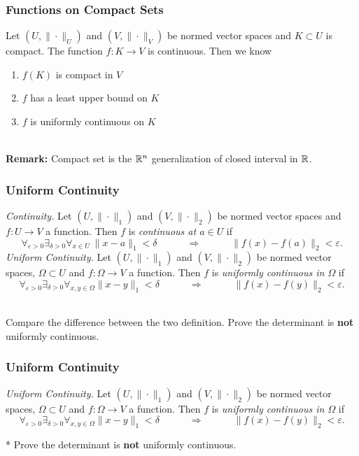 \documentclass[12pt, t]{beamer}
\renewcommand{\emph}[1]{{\color{Turquoise3}\textsl{#1}}}
\newcommand{\nullspace}{~\\[15pt]}
\begin{document}
\begin{frame}
    \frametitle{Functions on Compact Sets}
    Let $\left(U,\|\cdot\|_{U}\right)$ and $\left(V,\|\cdot\|_{V}\right)$ be normed vector spaces and $K \subset U$ is compact. The function $f: K \rightarrow V$ is continuous. Then we know
    \begin{enumerate}
        \item $f(K)$ is compact in $V$
        \item $f$ has a least upper bound on $K$
        \item $f$ is uniformly continuous on $K$
    \end{enumerate}
    \nullspace
    \textbf{Remark:} Compact set is the $\mathbb{R}^n$ generalization of closed interval in $\mathbb{R}$.
\end{frame}

\begin{frame}
    \frametitle{Uniform Continuity}
    \emph{Continuity.}
    Let $(U,\|\cdot\|_1)$ and $(V,\|\cdot\|_2)$ be normed vector spaces and $f:U\to V$ a function. Then $f$ is \emph{continuous at $a\in U$} if
    \begin{equation}\label{2.1.9}
        \mathop{\forall}_{\varepsilon>0}\mathop{\exists}_{\delta>0}\mathop{\forall}_{x\in U}~\|x-a\|_1<\delta\qquad\quad\Rightarrow\qquad\quad\|f(x)-f(a)\|_2<\varepsilon.
    \end{equation}
    \emph{Uniform Continuity.}
    Let $(U,\|\cdot\|_1)$ and $(V,\|\cdot\|_2)$ be normed vector spaces, $\Omega\subset U$ and $f:\Omega\to V$ a function. Then $f$ is \emph{uniformly continuous in $\Omega$} if
    \begin{equation}\label{2.1.13}
        \mathop{\forall}_{\varepsilon>0}\mathop{\exists}_{\delta>0}\mathop{\forall}_{x,y\in\Omega}\|x-y\|_1<\delta\qquad
        \quad\Rightarrow\qquad\quad\|f(x)-f(y)\|_2<\varepsilon.
    \end{equation}

    \nullspace
    Compare the difference between the two definition. \pause  * Prove the determinant is \textbf{not} uniformly continuous.
\end{frame}

\begin{frame}
    \frametitle{Uniform Continuity}
    \emph{Uniform Continuity.}
    Let $(U,\|\cdot\|_1)$ and $(V,\|\cdot\|_2)$ be normed vector spaces, $\Omega\subset U$ and $f:\Omega\to V$ a function. Then $f$ is \emph{uniformly continuous in $\Omega$} if
    \begin{equation}\label{2.1.13}
        \mathop{\forall}_{\varepsilon>0}\mathop{\exists}_{\delta>0}\mathop{\forall}_{x,y\in\Omega}\|x-y\|_1<\delta\qquad
        \quad\Rightarrow\qquad\quad\|f(x)-f(y)\|_2<\varepsilon.
    \end{equation}

    * Prove the determinant is \textbf{not} uniformly continuous.
\end{frame}
\end{document}
